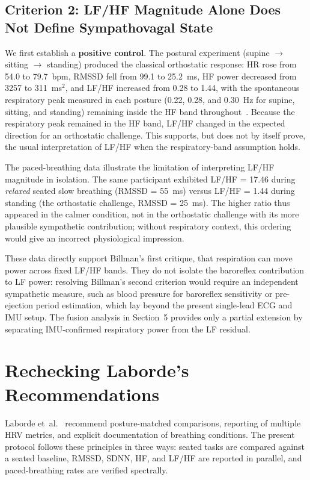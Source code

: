 \documentclass[11pt,a4paper]{article}
\begin{document}
\subsection{Criterion 2: LF/HF Magnitude Alone Does Not Define
Sympathovagal State}
\label{sec:crit2}

We first establish a \textbf{positive control}. The postural experiment
(supine $\to$ sitting $\to$ standing) produced the classical orthostatic
response: HR rose from 54.0 to 79.7~bpm, RMSSD fell from 99.1 to
25.2~ms, HF power decreased from 3257 to 311~ms$^{2}$, and LF/HF
increased from 0.28 to 1.44, with the spontaneous respiratory peak
measured in each posture (0.22, 0.28, and 0.30~Hz for supine, sitting,
and standing) remaining inside the HF band
throughout~\cite{taskforce1996}. Because the respiratory peak remained in
the HF band, LF/HF changed in the expected direction for an orthostatic
challenge. This supports, but does not by itself prove, the usual
interpretation of LF/HF when the respiratory-band assumption holds.

The paced-breathing data illustrate the limitation of interpreting LF/HF
magnitude in isolation. The same participant exhibited LF/HF = 17.46
during \emph{relaxed} seated slow breathing (RMSSD = 55~ms) versus
LF/HF = 1.44 during standing (the orthostatic challenge, RMSSD = 25~ms).
The higher ratio thus appeared in the calmer condition, not in the
orthostatic challenge with its more plausible sympathetic contribution;
without respiratory context, this ordering would give an incorrect
physiological impression.

These data directly support Billman's first critique, that respiration
can move power across fixed LF/HF bands. They do not isolate the
baroreflex contribution to LF power: resolving Billman's second criterion
would require an independent sympathetic measure, such as blood pressure
for baroreflex sensitivity or pre-ejection period estimation, which lay
beyond the present single-lead ECG and IMU setup. The fusion analysis in
Section~5 provides only a partial extension by separating IMU-confirmed
respiratory power from the LF residual.

\section{Rechecking Laborde's Recommendations}

Laborde et~al.~\cite{laborde2017} recommend posture-matched comparisons,
reporting of multiple HRV metrics, and explicit documentation of breathing
conditions. The present protocol follows these principles in three ways:
seated tasks are compared against a seated baseline, RMSSD, SDNN, HF, and
LF/HF are reported in parallel, and paced-breathing rates are verified
spectrally.
\end{document}
